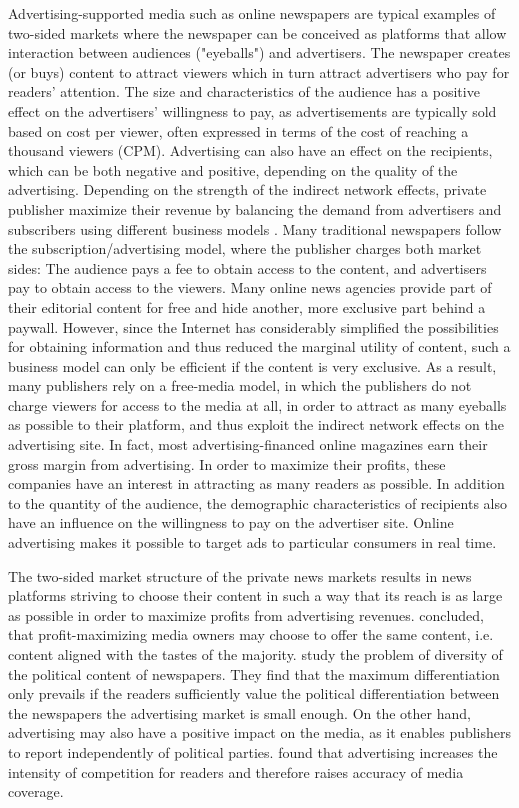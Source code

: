 \documentclass[12pt,a4paper,notitlepage]{article}
\begin{document}
Advertising-supported media such as online newspapers are typical examples of two-sided markets where the newspaper can be conceived as platforms that allow interaction between audiences ("eyeballs") and advertisers. The newspaper creates (or buys) content to attract viewers which in turn attract advertisers who pay for readers' attention.\cite{evans_industrial_2005} The size and characteristics of the audience has a positive effect on the advertisers' willingness to pay, as advertisements are typically sold based on cost per viewer, often expressed in terms of the cost of reaching a thousand viewers (CPM). Advertising can also have an effect on the recipients, which can be both negative and positive, depending on the quality of the advertising. Depending on the strength of the indirect network effects, private publisher maximize their revenue by balancing the demand from advertisers and subscribers using different business models \citep{evans_economics_2008}. Many traditional newspapers follow the subscription/advertising model, where the publisher charges both market sides: The audience pays a fee to obtain access to the content, and advertisers pay to obtain access to the viewers. Many online news agencies provide part of their editorial content for free and hide another, more exclusive part behind a paywall. However, since the Internet has considerably simplified the possibilities for obtaining information and thus reduced the marginal utility of content, such a business model can only be efficient if the content is very exclusive. As a result, many publishers rely on a free-media model, in which the publishers do not charge viewers for access to the media at all, in order to attract as many eyeballs as possible to their platform, and thus exploit the indirect network effects on the advertising site. In fact, most advertising-financed online magazines earn their gross margin from advertising.\cite{evans_industrial_2005} In order to maximize their profits, these companies have an interest in attracting as many readers as possible. In addition to the quantity of the audience, the demographic characteristics of recipients also have an influence on the willingness to pay on the advertiser site. Online advertising makes it possible to target ads to particular consumers in real time.
 
The two-sided market structure of the private news markets results in news platforms striving to choose their content in such a way that its reach is as large as possible in order to maximize profits from advertising revenues. \citep{steiner_program_1952} concluded, that profit-maximizing media owners may choose to offer the same content, i.e. content aligned with the tastes of the majority. \citep{gabszewicz_press_2001} study the problem of diversity of the political content of newspapers. They find that the maximum differentiation only prevails if the readers sufficiently value the political differentiation between the newspapers the advertising market is small enough. On the other hand, advertising may also have a positive impact on the media, as it enables publishers to report independently of political parties. \citet{ellman_what_2009} found that advertising increases the intensity of competition for readers and therefore raises accuracy of media coverage. 
\end{document}
